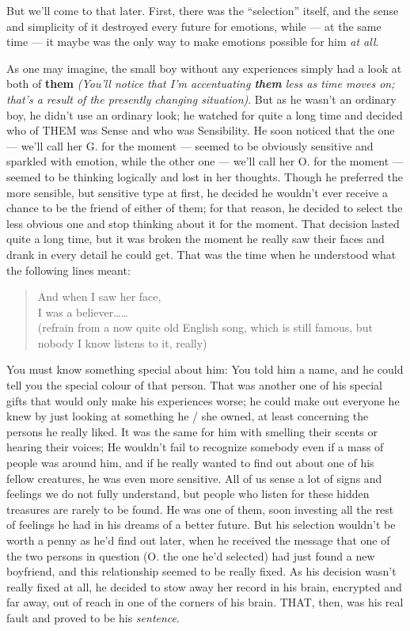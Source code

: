 But we'll come to that later. First, there was the \enquote{selection} itself, and the sense and simplicity of it destroyed every future for emotions, while --- at the same time --- it maybe was the only way to make emotions possible for him \emph{at all}.

As one may imagine, the small boy without any experiences simply had a look at both of \textbf{them} \emph{(You'll notice that I'm accentuating \textbf{them} less as time moves on; that's a result of the presently changing situation)}. But as he wasn't an ordinary boy, he didn't use an ordinary look; he watched for quite a long time and decided who of THEM was Sense and who was Sensibility. He soon noticed that the one --- we'll call her G. for the moment --- seemed to be obviously sensitive and sparkled with emotion, while the other one --- we'll call her O. for the moment --- seemed to be thinking logically and lost in her thoughts. Though he preferred the more sensible, but sensitive type at first, he decided he wouldn't ever receive a chance to be the friend of either of them; for that reason, he decided to select the less obvious one and stop thinking about it for the moment. That decision lasted quite a long time, but it was broken the moment he really saw their faces and drank in every detail he could get.
That was the time when he understood what the following lines meant:
\begin{verse}  
  And when I saw her face,\\
  I was a believer\ldots\ldots\\
  (refrain from a now quite old English song, which is still famous, but nobody I know listens to it, really)
\end{verse}
You must know something special about him: You told him a name, and he could tell you the special colour of that person. That was another one of his special gifts that would only make his experiences worse; he could make out everyone he knew by just looking at something he / she owned, at least concerning the persons he really liked. It was the same for him with smelling their scents or hearing their voices; He wouldn't fail to recognize somebody even if a mass of people was around him, and if he really wanted to find out about one of his fellow creatures, he was even more sensitive. All of us sense a lot of signs and feelings we do not fully understand, but people who listen for these hidden treasures are rarely to be found. 
He was one of them, soon investing all the rest of feelings he had in his dreams of a better future. But his selection wouldn't be worth a penny as he'd find out later, when he received the message that one of the two persons in question (O. the one he'd selected) had just found a new boyfriend, and this relationship seemed to be really fixed. As his decision wasn't really fixed at all, he decided to stow away her record in his brain, encrypted and far away, out of reach in one of the corners of his brain. THAT, then, was his real fault and proved to be his \emph{sentence}.


